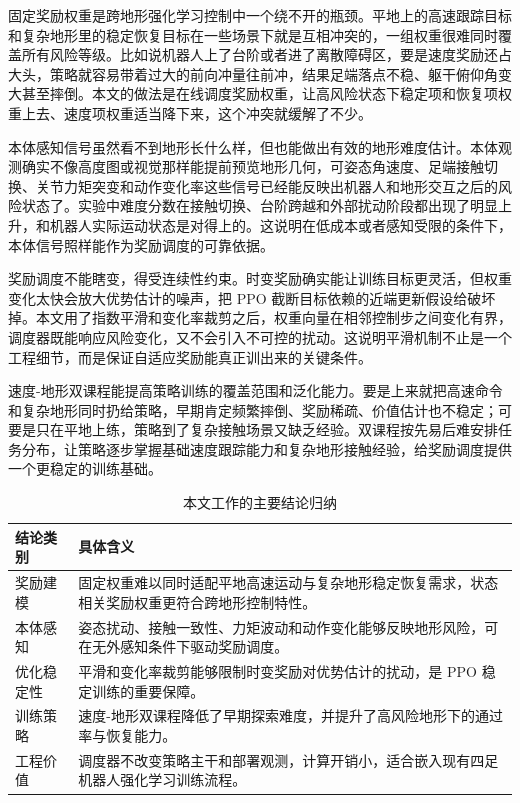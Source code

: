 \documentclass[12pt,a4paper]{ctexart}
\numberwithin{equation}{section}
\numberwithin{table}{section}
\numberwithin{figure}{section}
\begin{document}
固定奖励权重是跨地形强化学习控制中一个绕不开的瓶颈。平地上的高速跟踪目标和复杂地形里的稳定恢复目标在一些场景下就是互相冲突的，一组权重很难同时覆盖所有风险等级。比如说机器人上了台阶或者进了离散障碍区，要是速度奖励还占大头，策略就容易带着过大的前向冲量往前冲，结果足端落点不稳、躯干俯仰角变大甚至摔倒。本文的做法是在线调度奖励权重，让高风险状态下稳定项和恢复项权重上去、速度项权重适当降下来，这个冲突就缓解了不少。

本体感知信号虽然看不到地形长什么样，但也能做出有效的地形难度估计。本体观测确实不像高度图或视觉那样能提前预览地形几何，可姿态角速度、足端接触切换、关节力矩突变和动作变化率这些信号已经能反映出机器人和地形交互之后的风险状态了。实验中难度分数在接触切换、台阶跨越和外部扰动阶段都出现了明显上升，和机器人实际运动状态是对得上的。这说明在低成本或者感知受限的条件下，本体信号照样能作为奖励调度的可靠依据。

奖励调度不能瞎变，得受连续性约束。时变奖励确实能让训练目标更灵活，但权重变化太快会放大优势估计的噪声，把 PPO 截断目标依赖的近端更新假设给破坏掉。本文用了指数平滑和变化率裁剪之后，权重向量在相邻控制步之间变化有界，调度器既能响应风险变化，又不会引入不可控的扰动。这说明平滑机制不止是一个工程细节，而是保证自适应奖励能真正训出来的关键条件。

速度-地形双课程能提高策略训练的覆盖范围和泛化能力。要是上来就把高速命令和复杂地形同时扔给策略，早期肯定频繁摔倒、奖励稀疏、价值估计也不稳定；可要是只在平地上练，策略到了复杂接触场景又缺乏经验。双课程按先易后难安排任务分布，让策略逐步掌握基础速度跟踪能力和复杂地形接触经验，给奖励调度提供一个更稳定的训练基础。

\begin{table}[H]
\centering
\caption{本文工作的主要结论归纳}
\begin{tabular}{p{}p{}}
\toprule
结论类别 & 具体含义 \\
\midrule
奖励建模 & 固定权重难以同时适配平地高速运动与复杂地形稳定恢复需求，状态相关奖励权重更符合跨地形控制特性。 \\
本体感知 & 姿态扰动、接触一致性、力矩波动和动作变化能够反映地形风险，可在无外感知条件下驱动奖励调度。 \\
优化稳定性 & 平滑和变化率裁剪能够限制时变奖励对优势估计的扰动，是 PPO 稳定训练的重要保障。 \\
训练策略 & 速度-地形双课程降低了早期探索难度，并提升了高风险地形下的通过率与恢复能力。 \\
工程价值 & 调度器不改变策略主干和部署观测，计算开销小，适合嵌入现有四足机器人强化学习训练流程。 \\
\bottomrule
\end{tabular}
\end{table}
\end{document}
